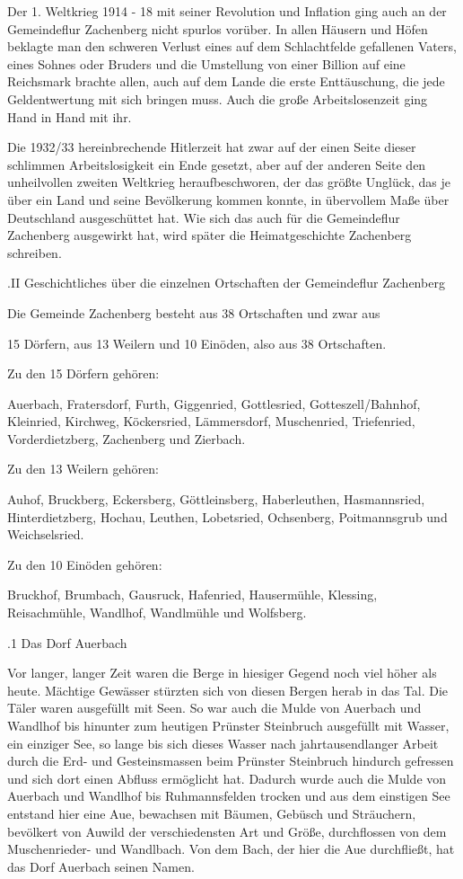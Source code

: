Der 1. Weltkrieg 1914 - 18 mit seiner Revolution und Inflation ging auch an der
Gemeindeflur Zachenberg nicht spurlos vorüber. In allen Häusern und Höfen
beklagte man den schweren Verlust eines auf dem Schlachtfelde gefallenen Vaters,
eines Sohnes oder Bruders und die Umstellung von einer Billion auf eine
Reichsmark brachte allen, auch auf dem Lande die erste Enttäuschung, die jede
Geldentwertung mit sich bringen muss. Auch die große Arbeitslosenzeit ging Hand
in Hand mit ihr.

Die 1932/33 hereinbrechende Hitlerzeit hat zwar auf der einen Seite dieser
schlimmen Arbeitslosigkeit ein Ende gesetzt, aber auf der anderen Seite den
unheilvollen zweiten Weltkrieg heraufbeschworen, der das größte Unglück, das je
über ein Land und seine Bevölkerung kommen konnte, in übervollem Maße über
Deutschland ausgeschüttet hat. Wie sich das auch für die Gemeindeflur Zachenberg
ausgewirkt hat, wird später die Heimatgeschichte Zachenberg schreiben.



.II Geschichtliches über die einzelnen Ortschaften der Gemeindeflur Zachenberg

Die Gemeinde Zachenberg besteht aus 38 Ortschaften und zwar aus

15 Dörfern, aus 13 Weilern und 10 Einöden, also aus 38 Ortschaften.



Zu den 15 Dörfern gehören:

Auerbach, Fratersdorf, Furth, Giggenried, Gottlesried, Gotteszell/Bahnhof,
Kleinried, Kirchweg, Köckersried, Lämmersdorf, Muschenried, Triefenried, 
Vorderdietzberg, Zachenberg und Zierbach.



Zu den 13 Weilern gehören:

Auhof, Bruckberg, Eckersberg, Göttleinsberg, Haberleuthen, Hasmannsried,
Hinterdietzberg, Hochau, Leuthen, Lobetsried, Ochsenberg, Poitmannsgrub und
Weichselsried.



Zu den 10 Einöden gehören:

Bruckhof, Brumbach, Gausruck, Hafenried, Hausermühle, Klessing, Reisachmühle,
Wandlhof, Wandlmühle und Wolfsberg.

.1 Das Dorf Auerbach

Vor langer, langer Zeit waren die Berge in hiesiger Gegend noch viel höher als
heute. Mächtige Gewässer stürzten sich von diesen Bergen herab in das Tal. Die
Täler waren ausgefüllt mit Seen. So war auch die Mulde von Auerbach und Wandlhof
bis hinunter zum heutigen Prünster Steinbruch ausgefüllt mit Wasser, ein
einziger See, so lange bis sich dieses Wasser nach jahrtausendlanger Arbeit
durch die Erd- und Gesteinsmassen beim Prünster Steinbruch hindurch gefressen
und sich dort einen Abfluss ermöglicht hat. Dadurch wurde auch die Mulde von
Auerbach und Wandlhof bis Ruhmannsfelden trocken und aus dem einstigen See
entstand hier eine Aue, bewachsen mit Bäumen, Gebüsch und Sträuchern, bevölkert
von Auwild der verschiedensten Art und Größe, durchflossen von dem
Muschenrieder- und Wandlbach. Von dem Bach, der hier die Aue durchfließt, hat
das Dorf Auerbach seinen Namen.

